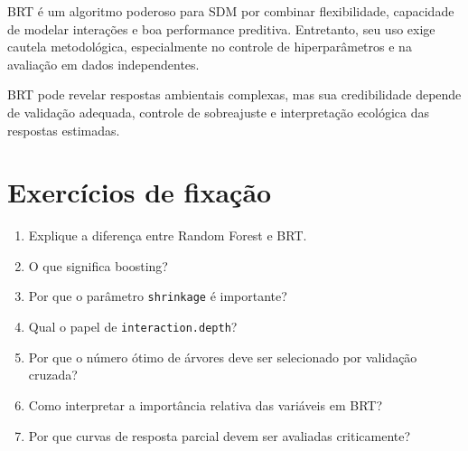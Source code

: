 BRT é um algoritmo poderoso para SDM por combinar flexibilidade, capacidade de modelar interações e boa performance preditiva. Entretanto, seu uso exige cautela metodológica, especialmente no controle de hiperparâmetros e na avaliação em dados independentes.

\begin{conceito}[title={\faBook\quad Mensagem central}]
	BRT pode revelar respostas ambientais complexas, mas sua credibilidade depende de validação adequada, controle de sobreajuste e interpretação ecológica das respostas estimadas.
\end{conceito}

\section{Exercícios de fixação}

\begin{enumerate}
	\item Explique a diferença entre Random Forest e BRT.
	\item O que significa boosting?
	\item Por que o parâmetro \texttt{shrinkage} é importante?
	\item Qual o papel de \texttt{interaction.depth}?
	\item Por que o número ótimo de árvores deve ser selecionado por validação cruzada?
	\item Como interpretar a importância relativa das variáveis em BRT?
	\item Por que curvas de resposta parcial devem ser avaliadas criticamente?
\end{enumerate}


